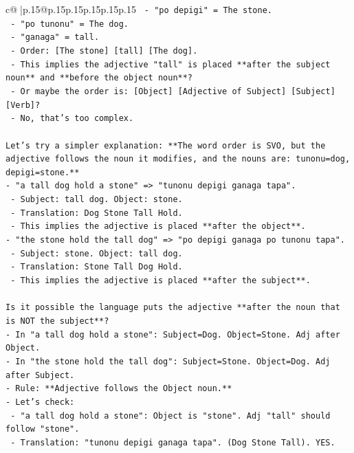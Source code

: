 \documentclass{article}
\begin{document}
{\begin{supertabular}{c@{$\;$}|p{.15\linewidth}@{}p{.15\linewidth}p{.15\linewidth}p{.15\linewidth}p{.15\linewidth}p{.15\linewidth}}
{{{\texttt{  {-} "po depigi" = The stone.} \\
\texttt{  {-} "po tunonu" = The dog.} \\
\texttt{  {-} "ganaga" = tall.} \\
\texttt{  {-} Order: {[}The stone{]} {[}tall{]} {[}The dog{]}.} \\
\texttt{  {-} This implies the adjective "tall" is placed **after the subject noun** and **before the object noun**?} \\
\texttt{  {-} Or maybe the order is: {[}Object{]} {[}Adjective of Subject{]} {[}Subject{]} {[}Verb{]}?} \\
\texttt{  {-} No, that's too complex.} \\
\\ 
\texttt{Let's try a simpler explanation: **The word order is SVO, but the adjective follows the noun it modifies, and the nouns are: tunonu=dog, depigi=stone.**} \\
\texttt{{-} "a tall dog hold a stone" => "tunonu depigi ganaga tapa".} \\
\texttt{  {-} Subject: tall dog. Object: stone.} \\
\texttt{  {-} Translation: Dog Stone Tall Hold.} \\
\texttt{  {-} This implies the adjective is placed **after the object**.} \\
\texttt{{-} "the stone hold the tall dog" => "po depigi ganaga po tunonu tapa".} \\
\texttt{  {-} Subject: stone. Object: tall dog.} \\
\texttt{  {-} Translation: Stone Tall Dog Hold.} \\
\texttt{  {-} This implies the adjective is placed **after the subject**.} \\
\\ 
\texttt{Is it possible the language puts the adjective **after the noun that is NOT the subject**?} \\
\texttt{{-} In "a tall dog hold a stone": Subject=Dog. Object=Stone. Adj after Object.} \\
\texttt{{-} In "the stone hold the tall dog": Subject=Stone. Object=Dog. Adj after Subject.} \\
\texttt{{-} Rule: **Adjective follows the Object noun.**} \\
\texttt{{-} Let's check:} \\
\texttt{  {-} "a tall dog hold a stone": Object is "stone". Adj "tall" should follow "stone".} \\
\texttt{    {-} Translation: "tunonu depigi ganaga tapa". (Dog Stone Tall). YES.} \\
}}}
\end{supertabular}}
\end{document}
